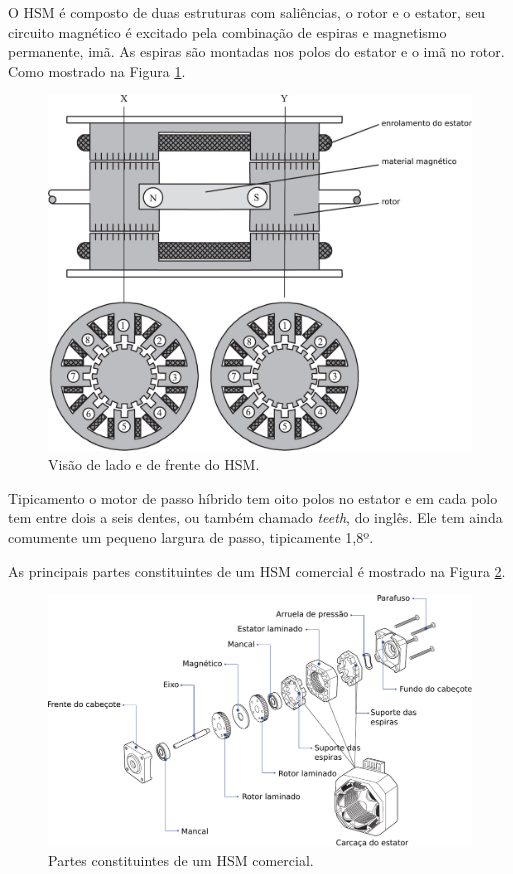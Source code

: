 O HSM é composto de duas estruturas com saliências, o rotor e o estator, seu circuito magnético é excitado pela combinação de espiras e magnetismo permanente, imã. As espiras são montadas nos polos do estator e o imã no rotor. Como mostrado na Figura \ref{fig:estrutura_HSM}. \cite{SteppingBook}

	\begin{figure}[!h]
		\centering
		\includegraphics[width = \columnwidth]{Images/estrutura_HSM.pdf}
		\caption{Visão de lado e de frente do HSM. \cite{SteppingBook}}
		\label{fig:estrutura_HSM}
	\end{figure}
	
Tipicamento o motor de passo híbrido tem oito polos no estator e em cada polo tem entre dois a seis dentes, ou também chamado \emph{teeth}, do inglês. Ele tem ainda comumente um pequeno largura de passo, tipicamente 1,8º. \cite{SteppingBook}

As principais partes constituintes de um HSM comercial é mostrado na Figura \ref{fig:partes_SM}.

	\begin{figure}[!h]
		\centering
		\includegraphics[width = \columnwidth]{Images/partes_HSM.pdf}
		\caption{Partes constituintes de um HSM comercial. \cite{MoonsHSM}}
		\label{fig:partes_SM}
	\end{figure}